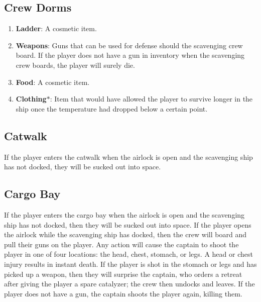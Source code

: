 \documentclass[12pt]{article}
\begin{document}
\subsection{Crew Dorms}

\begin{enumerate}
  \item \textbf{Ladder}: A cosmetic item.
  \item \textbf{Weapons}: Guns that can be used for defense should the
    scavenging crew board. If the player does not have a gun in inventory when
    the scavenging crew boards, the player will surely die.
  \item \textbf{Food}: A cosmetic item.
  \item \textbf{Clothing}$\ast$: Item that would have allowed the player to survive
    longer in the ship once the temperature had dropped below a certain point.
\end{enumerate}



\subsection{Catwalk}

\qq If the player enters the catwalk when the airlock is open and the scavenging
ship has not docked, they will be sucked out into space.



\subsection{Cargo Bay}

\qq If the player enters the cargo bay when the airlock is open and the
scavenging ship has not docked, then they will be sucked out into space. If the
player opens the airlock while the scavenging ship has docked, then the crew
will board and pull their guns on the player. Any action will cause the captain
to shoot the player in one of four locations: the head, chest, stomach, or
legs. A head or chest injury results in instant death. If the player is shot in
the stomach or legs and has picked up a weapon, then they will surprise the
captain, who orders a retreat after giving the player a spare catalyzer; the
crew then undocks and leaves. If the player does not have a gun, the captain
shoots the player again, killing them.
\end{document}
